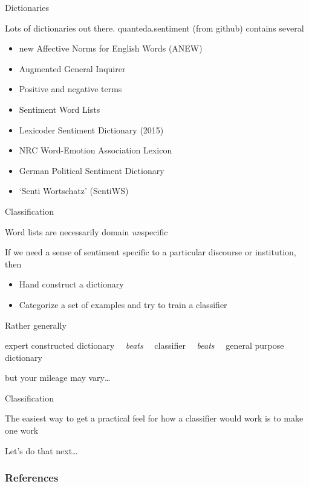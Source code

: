 \documentclass{hertieteaching}
\begin{document}
\begin{frame}{Dictionaries}

Lots of dictionaries out there. \textsf{quanteda.sentiment} (from github) contains several
\begin{itemize}
  \item \textcite{Nielsen2011} new Affective Norms for English Words (ANEW)
  \item \textcite{Stone.etal1966} Augmented General Inquirer
  \item \textcite{Hu.Liu2004} Positive and negative terms
  \item \textcite{Loughran.Mcdonald2011} Sentiment Word Lists
  \item \textcite{Albugh.etal2013} Lexicoder Sentiment Dictionary (2015)
  \item \textcite{Mohammad.Turney2013} NRC Word-Emotion Association Lexicon
  \item \textcite{Rauh2018} German Political Sentiment Dictionary
  \item \textcite{Remus.etal2010} `Senti Wortschatz' (SentiWS) 
\end{itemize}

  
\end{frame}
\begin{frame}{Classification}

Word lists are necessarily domain \textit{un}specific

If we need a sense of sentiment specific to a particular discourse or institution, then 
\begin{itemize}
  \item Hand construct a dictionary
  \item Categorize a set of examples and try to train a classifier
\end{itemize}

Rather generally

\bigskip
\centerline{expert constructed dictionary ~~\textit{beats}~~ classifier ~~\textit{beats}~~ general purpose dictionary}

but your mileage may vary\ldots 

\end{frame}

\begin{frame}{Classification}

The easiest way to get a practical feel for how a classifier would work is to make one work

Let's do that next\ldots   
\end{frame}




\begin{frame}[allowframebreaks]
\frametitle{References}
\printbibliography	
\end{frame}
\end{document}
